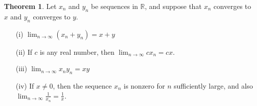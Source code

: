 \documentclass[12pt]{article}
\theoremstyle{definition}
\theoremstyle{theorem}
\newtheorem{theorem}[definition]{Theorem}
\begin{document}
\begin{theorem}
Let $x_n$ and $y_n$ be sequences in $\mathbb{R}$, and suppose that $x_n$ converges to $x$ and $y_n$ converges to $y$.  
\begin{enumerate}
\item[(i)] $\lim_{n \to \infty}(x_n + y_n) = x + y$ 
\item[(ii)] If $c$ is any real number, then $\lim_{n \to \infty} cx_n = cx$. 
\item[(iii)] $\lim_{n \to \infty} x_ny_n = xy$
\item[(iv)] If $x \ne 0$, then the sequence $x_n$ is nonzero for $n$ sufficiently large, and also $\lim_{n \to \infty} \frac{1}{x_n} = \frac{1}{x}$. 
\end{enumerate}
\end{theorem}
\end{document}
